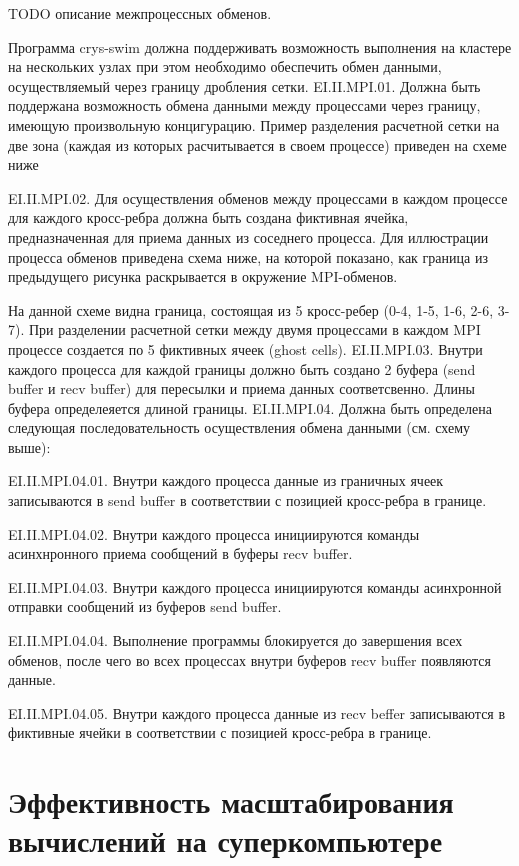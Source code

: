 \documentclass[
11pt,%
tightenlines,%
twoside,%
onecolumn,%
nofloats,%
nobibnotes,%
nofootinbib,%
superscriptaddress,%
noshowpacs,%
centertags]%
{revtex4}
\begin{document}
TODO описание межпроцессных обменов.

Программа crys-swim должна поддерживать возможность выполнения на кластере на нескольких узлах при этом необходимо обеспечить обмен данными, осуществляемый через границу дробления сетки.
 EI.II.MPI.01. Должна быть поддержана возможность обмена данными между процессами через границу, имеющую произвольную концигурацию. Пример разделения расчетной сетки на две зона (каждая из которых расчитывается в своем процессе) приведен на схеме ниже

EI.II.MPI.02. Для осуществления обменов между процессами в каждом процессе для каждого кросс-ребра должна быть создана фиктивная ячейка, предназначенная для приема данных из соседнего процесса.
Для иллюстрации процесса обменов приведена схема ниже, на которой показано, как граница из предыдущего рисунка раскрывается в окружение MPI-обменов.

На данной схеме видна граница, состоящая из 5 кросс-ребер (0-4, 1-5, 1-6, 2-6, 3-7). При разделении расчетной сетки между двумя процессами в каждом MPI процессе создается по 5 фиктивных ячеек (ghost cells).
 EI.II.MPI.03. Внутри каждого процесса для каждой границы должно быть создано 2 буфера (send buffer и recv buffer) для пересылки и приема данных соответсвенно. Длины буфера определеяется длиной границы.
 EI.II.MPI.04. Должна быть определена следующая последовательность осуществления обмена данными (см. схему выше):

 EI.II.MPI.04.01. Внутри каждого процесса данные из граничных ячеек записываются в send buffer в соответствии с позицией кросс-ребра в границе.

 EI.II.MPI.04.02. Внутри каждого процесса инициируются команды асинхнронного приема сообщений в буферы recv buffer.

 EI.II.MPI.04.03. Внутри каждого процесса инициируются команды асинхронной отправки сообщений из буферов send buffer.

 EI.II.MPI.04.04. Выполнение программы блокируется до завершения всех обменов, после чего во всех процессах внутри буферов recv buffer появляются данные.

 EI.II.MPI.04.05. Внутри каждого процесса данные из recv beffer записываются в фиктивные ячейки в соответствии с позицией кросс-ребра в границе.

\section{Эффективность масштабирования вычислений на суперкомпьютере}
\end{document}
